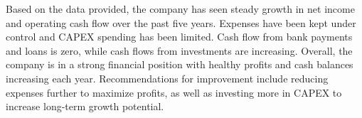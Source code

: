 

Based on the data provided, the company has seen steady growth in net income and operating cash flow over the past five years. Expenses have been kept under control and CAPEX spending has been limited. Cash flow from bank payments and loans is zero, while cash flows from investments are increasing. Overall, the company is in a strong financial position with healthy profits and cash balances increasing each year. Recommendations for improvement include reducing expenses further to maximize profits, as well as investing more in CAPEX to increase long-term growth potential.